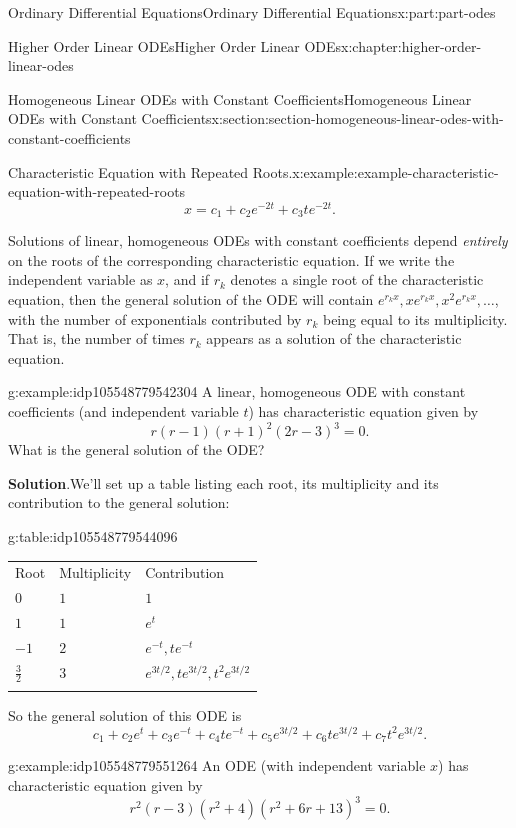 \documentclass[oneside,10pt,]{book}
\newcommand{\blocktitlefont}{\relax}
\newcommand{\tabularfont}{\relax}
\numberwithin{equation}{part}
\newcommand{\hrulethick} {\noalign{\hrule height 0.11em}}
\begin{document}
\begin{partptx}{Ordinary Differential Equations}{}{Ordinary Differential Equations}{}{}{x:part:part-odes}
\begin{chapterptx}{Higher Order Linear ODEs}{}{Higher Order Linear ODEs}{}{}{x:chapter:higher-order-linear-odes}
\begin{sectionptx}{Homogeneous Linear ODEs with Constant Coefficients}{}{Homogeneous Linear ODEs with Constant Coefficients}{}{}{x:section:section-homogeneous-linear-odes-with-constant-coefficients}
\begin{example}{Characteristic Equation with Repeated Roots.}{x:example:example-characteristic-equation-with-repeated-roots}
\begin{equation*}
x = c_{1}+c_{2}e^{-2t}+c_{3}te^{-2t}.
\end{equation*}
%
\end{example}
Solutions of linear, homogeneous ODEs with constant coefficients depend \emph{entirely} on the roots of the corresponding characteristic equation. If we write the independent variable as \(x\), and if \(r_{k}\) denotes a single root of the characteristic equation, then the general solution of the ODE will contain \(e^{r_{k}x},xe^{r_{k}x},x^{2}e^{r_{k}x},\dots\), with the number of exponentials contributed by \(r_{k}\) being equal to its multiplicity. That is, the number of times \(r_{k}\) appears as a solution of the characteristic equation.%
\begin{example}{}{g:example:idp105548779542304}%
A linear, homogeneous ODE with constant coefficients (and independent variable \(t\)) has characteristic equation given by%
\begin{equation*}
r(r-1)(r+1)^{2}(2r-3)^{3} = 0.
\end{equation*}
What is the general solution of the ODE?%
\par\smallskip%
\noindent\textbf{\blocktitlefont Solution}.\hypertarget{g:solution:idp105548779543584}{}\quad{}We'll set up a table listing each root, its multiplicity and its contribution to the general solution:%
\begin{tableptx}{\textbf{}}{g:table:idp105548779544096}{}%
\centering%
{\tabularfont%
\begin{tabular}{lll}\hrulethick
Root&Multiplicity&Contribution\tabularnewline\hrulethick
\(0\)&\(1\)&\(1\)\tabularnewline\hrulethick
\(1\)&\(1\)&\(e^{t}\)\tabularnewline\hrulethick
\(-1\)&\(2\)&\(e^{-t},te^{-t}\)\tabularnewline\hrulethick
\(\frac{3}{2}\)&\(3\)&\(e^{3t/2},te^{3t/2},t^{2}e^{3t/2}\)\tabularnewline\hrulethick
\end{tabular}
}%
\end{tableptx}%
 So the general solution of this ODE is%
\begin{equation*}
c_{1}+c_{2}e^{t}+c_{3}e^{-t}+c_{4}te^{-t}+c_{5}e^{3t/2}+c_{6}te^{3t/2}+c_{7}t^{2}e^{3t/2}.
\end{equation*}
\end{example}
\begin{example}{}{g:example:idp105548779551264}%
An ODE (with independent variable \(x\)) has characteristic equation given by%
\begin{equation*}
r^{2}(r-3)(r^{2}+4)(r^{2}+6r+13)^{3}=0.
\end{equation*}

\end{example}
\end{sectionptx}
\end{chapterptx}
\end{partptx}
\end{document}
